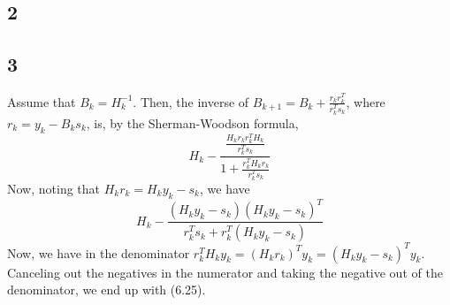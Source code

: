 \documentclass{article}
\begin{document}
\subsection*{2}
\subsection*{3}
Assume that $B_k=H_k^{-1}$. Then, the inverse of $B_{k+1}=B_k+\frac{r_kr_k^T}{r_k^Ts_k}$, where $r_k=y_k-B_ks_k$, is, by the Sherman-Woodson formula, 
\[H_k-\frac{\frac{H_kr_kr_k^TH_k}{r_k^Ts_k}}{1+\frac{r_k^TH_kr_k}{r_k^Ts_k}}\]
Now, noting that $H_kr_k=H_ky_k-s_k$, we have
\[H_k-\frac{(H_ky_k-s_k)(H_ky_k-s_k)^T}{r_k^Ts_k+r_k^T(H_ky_k-s_k)}\]
Now, we have in the denominator $r_k^TH_ky_k=(H_kr_k)^Ty_k=(H_ky_k-s_k)^Ty_k$. Canceling out the negatives in the numerator and taking the negative out of the denominator, we end up with (6.25).
\end{document}
